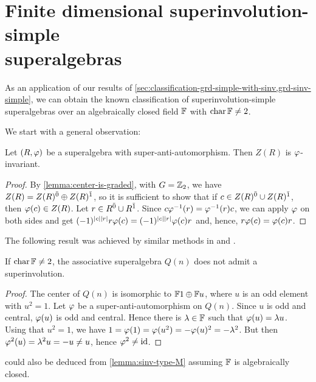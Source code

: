 
\section[Finite dimensional superinvolution-simple superalgebras]{Finite dimensional superinvolution-simple \\ superalgebras}\label{sec:sinv-simple}

As an application of our results of \cref{sec:classification-grd-simple-with-sinv,grd-sinv-simple}, we can obtain the known classification of superinvolution-simple superalgebras over an algebraically closed field $\mathbb{F}$ with $\operatorname{char} \mathbb{F} \neq 2$. 

We start with a general observation: 

\begin{lemma}
	Let $(R, \varphi)$ be a superalgebra with super-anti-automorphism.
	Then $Z(R)$ is $\varphi$-invariant.
\end{lemma}

\begin{proof}
	By \cref{lemma:center-is-graded}, with $G = \mathbb{Z}_2$, we have $Z(R) = Z(R)^{\bar0} \oplus Z(R)^{\bar1}$, so it is sufficient to show that if $c \in Z(R)^{\bar0} \cup Z(R)^{\bar1}$, then $\varphi(c) \in Z(R)$. 
	Let $r \in R^{\bar0} \cup R^{\bar1}$.
	Since $c\varphi^{-1} (r) = \varphi^{-1} (r)c$, we can apply $\varphi$ on both sides and get $(-1)^{|c||r|} r \varphi(c) = (-1)^{|c||r|} \varphi(c) r$ and, hence, $r \varphi(c) = \varphi(c) r$.
\end{proof}

The following result was achieved by similar methods in \cite[Theorem 8.1]{Sh98} and \cite[Theorem 28]{MR2407903}. 
\begin{cor}\label{cor:Q-no-sinv-center}
	If $\operatorname{char} \mathbb{F} \neq 2$, the associative superalgebra $Q(n)$ does not admit a superinvolution.
\end{cor}

\begin{proof}
	The center of $Q(n)$ is isomorphic to $\mathbb{F}1 \oplus \mathbb{F} u$, where $u$ is an odd element with $u^2 = 1$.
	Let $\varphi$ be a super-anti-automorphism on $Q(n)$.
	Since $u$ is odd and central, $\varphi(u)$ is odd and central.
	Hence there is $\lambda \in \mathbb{F}$ such that $\varphi(u) = \lambda u$.
	Using that $u^2 = 1$, we have $1 = \varphi(1) = \varphi(u^2) = - \varphi(u)^2 = - \lambda^2$.
	But then $\varphi^2 (u) = \lambda^2 u = -u \neq u$, hence $\varphi^2 \neq \operatorname{id}$.
\end{proof}

\begin{remark}
     could also be deduced from \cref{lemma:sinv-type-M} assuming $\mathbb{F}$ is algebraically closed. 
\end{remark}

